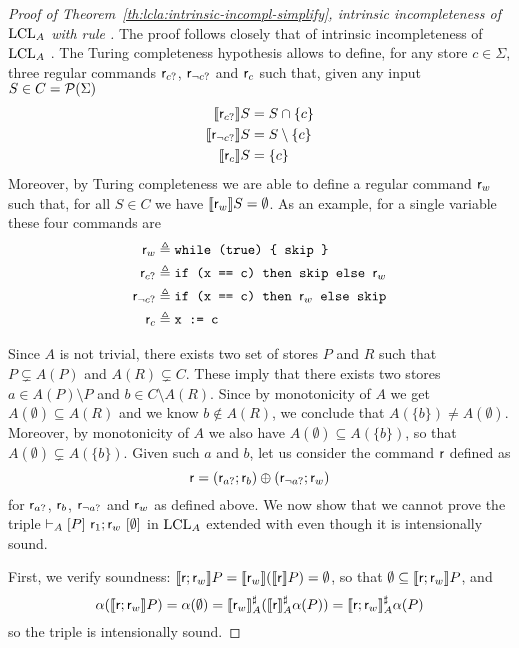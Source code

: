 \begin{proof}[Proof of Theorem~\ref{th:lcla:intrinsic-incompl-simplify}, intrinsic incompleteness of $\text{LCL}_A$ with rule ]
	The proof follows closely that of intrinsic incompleteness of $\text{LCL}_A$ \cite[Theorem~5.12]{BGGR21}.
	The Turing completeness hypothesis allows to define, for any store $c \in \Sigma$, three regular commands $\mathsf{r}_{c?}$, $\mathsf{r}_{\lnot c?}$ and $\mathsf{r}_{c}$ such that, given any input $S \in C = \mathcal{P}(\Sigma)$
	\begin{align*}
		\llbracket\mathsf{r}_{c?}\rrbracket S       & = S \cap \{ c \}      \\
		\llbracket\mathsf{r}_{\lnot c?}\rrbracket S & = S \setminus \{ c \} \\
		\llbracket\mathsf{r}_{c}\rrbracket S        & = \{ c \}
	\end{align*}
	Moreover, by Turing completeness we are able to define a regular command $\mathsf{r}_w$ such that, for all $S \in C$ we have $\llbracket\mathsf{r}_w\rrbracket S = \emptyset$.
	As an example, for a single variable  these four commands are
	\begin{align*}
		\mathsf{r}_w          & \triangleq \texttt{while (true) \{ skip \}}                    \\
		\mathsf{r}_{c?}       & \triangleq \texttt{if (x == c) then skip else } \mathsf{r}_w        \\
		\mathsf{r}_{\lnot c?} & \triangleq \texttt{if (x == c) then }\mathsf{r}_w \texttt{ else skip} \\
		\mathsf{r}_{c}        & \triangleq \texttt{x := c}
	\end{align*}

	Since $A$ is not trivial, there exists two set of stores $P$ and $R$ such that $P \subsetneq A(P)$ and $A(R) \subsetneq C$. These imply that there exists two stores $a \in A(P) \setminus P$ and $b \in C \setminus A(R)$. Since by monotonicity of $A$ we get $A(\emptyset) \subseteq A(R)$ and we know $b \notin A(R)$, we conclude that $A(\{ b \}) \neq A(\emptyset)$. Moreover, by monotonicity of $A$ we also have $A(\emptyset) \subseteq A(\{ b \})$, so that $A(\emptyset) \subsetneq A(\{ b \})$.
	Given such $a$ and $b$, let us consider the command $\mathsf{r}$ defined as
	\[
	\mathsf{r} = (\mathsf{r}_{a?}; \mathsf{r}_{b}) \oplus (\mathsf{r}_{\lnot a?}; \mathsf{r}_w)
	\]
	for $\mathsf{r}_{a?}$, $\mathsf{r}_{b}$, $\mathsf{r}_{\lnot a?}$ and $\mathsf{r}_w$ as defined above. We now show that we cannot prove the triple $\vdash_{A}\nobreak[P]~\mathsf{r}_1; \mathsf{r}_w~[\emptyset]$ in $\text{LCL}_A$ extended with  even though it is intensionally sound.

	First, we verify soundness: $\llbracket\mathsf{r}; \mathsf{r}_w\rrbracket P = \llbracket\mathsf{r}_w\rrbracket (\llbracket\mathsf{r}\rrbracket P) = \emptyset$, so that $\emptyset \subseteq \llbracket\mathsf{r}; \mathsf{r}_w\rrbracket P$, and
	\[
	\alpha(\llbracket\mathsf{r}; \mathsf{r}_w\rrbracket P) = \alpha(\emptyset) = \llbracket\mathsf{r}_w\rrbracket^{\sharp}_{A} (\llbracket\mathsf{r}\rrbracket^{\sharp}_{A} \alpha(P)) = \llbracket\mathsf{r}; \mathsf{r}_w\rrbracket^{\sharp}_{A} \alpha(P)
	\]
	so the triple is intensionally sound.


\end{proof}
